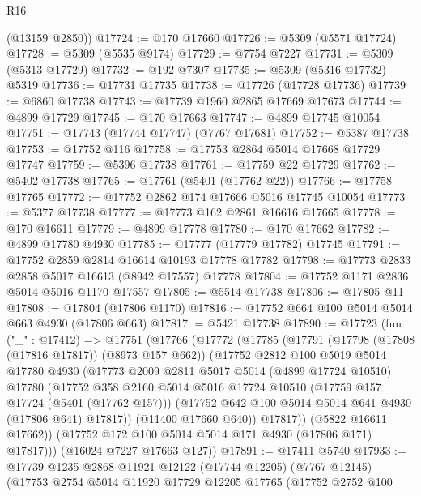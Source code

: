 \begin{lexlean}{R16}
\begin{coremodule}
      (@13159 @2850))
@17724 := @170 @17660
@17726 := @5309 (@5571 @17724)
@17728 := @5309 (@5535 @9174)
@17729 := @7754 @7227
@17731 := @5309 (@5313 @17729)
@17732 := @192 @7307
@17735 := @5309 (@5316 @17732) @5319
@17736 := @17731 @17735
@17738 := @17726 (@17728 @17736)
@17739 := @6860 @17738
@17743 := @17739 @1960 @2865 @17669 @17673
@17744 := @4899 @17729
@17745 := @170 @17663
@17747 := @4899 @17745 @10054
@17751 := @17743 (@17744 @17747) (@7767 @17681)
@17752 := @5387 @17738
@17753 := @17752 @116
@17758 := @17753 @2864 @5014 @17668 @17729 @17747
@17759 := @5396 @17738
@17761 := @17759 @22 @17729
@17762 := @5402 @17738
@17765 := @17761 (@5401 (@17762 @22))
@17766 := @17758 @17765
@17772 := @17752 @2862 @174 @17666 @5016 @17745 @10054
@17773 := @5377 @17738
@17777 := @17773 @162 @2861 @16616 @17665
@17778 := @170 @16611
@17779 := @4899 @17778
@17780 := @170 @17662
@17782 := @4899 @17780 @4930
@17785 := @17777 (@17779 @17782) @17745
@17791 := @17752 @2859 @2814 @16614 @10193 @17778 @17782
@17798 := @17773 @2833 @2858 @5017 @16613 (@8942 @17557) @17778
@17804 := @17752 @1171 @2836 @5014 @5016 @1170 @17557
@17805 := @5514 @17738
@17806 := @17805 @11
@17808 := @17804 (@17806 @1170)
@17816 := @17752 @664 @100 @5014 @5014 @663 @4930 (@17806 @663)
@17817 := @5421 @17738
@17890 := @17723
    (fun ("_" : @17412) =>
    @17751
      (@17766
        (@17772
          (@17785
            (@17791
              (@17798 (@17808 (@17816 @17817)) (@8973 @157 @662))
              (@17752
                @2812
                @100
                @5019
                @5014
                @17780
                @4930
                (@17773
                  @2009
                  @2811
                  @5017
                  @5014
                  (@4899 @17724 @10510)
                  @17780
                  (@17752
                    @358
                    @2160
                    @5014
                    @5016
                    @17724
                    @10510
                    (@17759 @157 @17724 (@5401 (@17762 @157)))
                    (@17752 @642 @100 @5014 @5014 @641 @4930 (@17806 @641) @17817))
                  (@11400 @17660 @640))
                @17817))
            (@5822 @16611 @17662))
          (@17752 @172 @100 @5014 @5014 @171 @4930 (@17806 @171) @17817)))
      (@16024 @7227 @17663 @127))
@17891 := @17411 @5740
@17933 := @17739
    @1235
    @2868
    @11921
    @12122
    (@17744 @12205)
    (@7767 @12145)
    (@17753
      @2754
      @5014
      @11920
      @17729
      @12205
      @17765
      (@17752
        @2752
        @100

\end{coremodule}
\end{lexlean}
